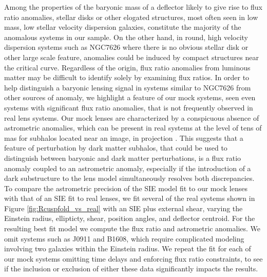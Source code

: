 Among the properties of the baryonic mass of a deflector likely to give rise to flux ratio anomalies, stellar disks or other elogated structures, most often seen in low mass, low stellar velocity dispersion galaxies, constitute the majority of the anomalous systems in our sample. On the other hand, in round, high velocity dispersion systems such as NGC7626 where there is no obvious stellar disk or other large scale feature, anomalies could be induced by compact structures near the critical curve. Regardless of the origin, flux ratio anomalies from luminous matter may be difficult to identify solely by examining flux ratios.
\newline \indent In order to help distinguish a baryonic lensing signal in systems similar to NGC7626 from other sources of anomaly, we highlight a feature of our mock systems, seen even systems with significant flux ratio anomalies, that is not frequently observed in real lens systems. Our mock lenses are characterized by a conspicuous absence of astrometric anomalies, which can be present in real systems at the level of tens of mas for subhalos located near an image, in projection \citep{Chiba02,Chen++07}. This suggests that a feature of perturbation by dark matter subhalos, that could be used to distinguish between baryonic and dark matter perturbations, is a flux ratio anomaly coupled to an astrometric anomaly, especially if the introduction of a dark substructure to the lens model simultaneously resolves both discrepancies.   
\newline \indent To compare the astrometric precision of the SIE model fit to our mock lenses with that of an SIE fit to real  lenses, we fit several of the real systems shown in Figure \ref{fig:Rcuspfold_vs_real} with an SIE plus external shear, varying the Einstein radius, ellipticty, shear, position angles, and deflector centroid. For the resulting best fit model we compute the flux ratio and astrometric anomalies. We omit systems such as J0911 and B1608, which require complicated modeling involving two galaxies within the Einstein radius. We repeat the fit for each of our mock systems omitting time delays and enforcing flux ratio constraints, to see if the inclusion or exclusion of either these data significantly impacts the results.
